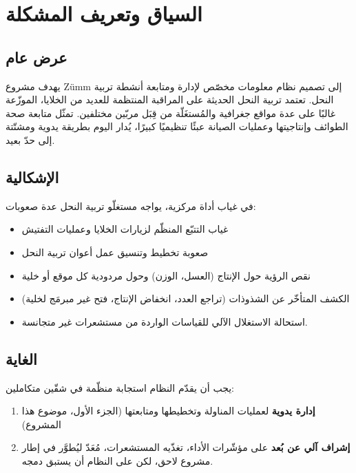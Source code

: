 \chapter{السياق وتعريف المشكلة}

\section{عرض عام}
يهدف مشروع \textenglish{Zümm} إلى تصميم نظام معلومات مخصّص لإدارة ومتابعة
أنشطة تربية النحل. تعتمد تربية النحل الحديثة على المراقبة المنتظمة للعديد من
الخلايا، الموزّعة غالبًا على عدة مواقع جغرافية والمُستغَلّة من قِبَل مربّين
مختلفين. تمثّل متابعة صحة الطوائف وإنتاجيتها وعمليات الصيانة عبئًا تنظيميًا
كبيرًا، يُدار اليوم بطريقة يدوية ومشتّتة إلى حدّ بعيد.

\section{الإشكالية}
في غياب أداة مركزية، يواجه مستغلّو تربية النحل عدة صعوبات:
\begin{itemize}
  \item غياب التتبّع المنظّم لزيارات الخلايا وعمليات التفتيش
  \item صعوبة تخطيط وتنسيق عمل أعوان تربية النحل
  \item نقص الرؤية حول الإنتاج (العسل، الوزن) وحول مردودية كل موقع أو خلية
  \item الكشف المتأخّر عن الشذوذات (تراجع العدد، انخفاض الإنتاج، فتح غير مبرمَج لخلية)
  \item استحالة الاستغلال الآلي للقياسات الواردة من مستشعرات غير متجانسة.
\end{itemize}

\section{الغاية}
يجب أن يقدّم النظام استجابة منظّمة في شقّين متكاملين:
\begin{enumerate}
  \item \textbf{إدارة يدوية} لعمليات المناولة وتخطيطها ومتابعتها (الجزء الأول،
        موضوع هذا المشروع)
  \item \textbf{إشراف آلي عن بُعد} على مؤشّرات الأداء، تغذّيه المستشعرات، مُعَدّ
        ليُطوَّر في إطار مشروع لاحق، لكن على النظام أن يستبق دمجه.
\end{enumerate}
